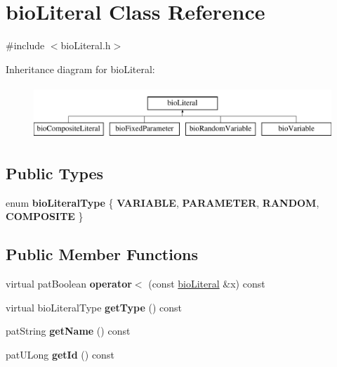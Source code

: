 \hypertarget{classbio_literal}{}\section{bio\+Literal Class Reference}
\label{classbio_literal}


{\ttfamily \#include $<$bio\+Literal.\+h$>$}

Inheritance diagram for bio\+Literal\+:\begin{figure}[H]
\begin{center}
\leavevmode
\includegraphics[height=2.000000cm]{classbio_literal}
\end{center}
\end{figure}
\subsection*{Public Types}
\begin{DoxyCompactItemize}
\item 
\mbox{\label{classbio_literal_aa49fb98b7d7846fdec644ef546b1a302}} 
enum {\bfseries bio\+Literal\+Type} \{ {\bfseries V\+A\+R\+I\+A\+B\+LE}, 
{\bfseries P\+A\+R\+A\+M\+E\+T\+ER}, 
{\bfseries R\+A\+N\+D\+OM}, 
{\bfseries C\+O\+M\+P\+O\+S\+I\+TE}
 \}
\end{DoxyCompactItemize}
\subsection*{Public Member Functions}
\begin{DoxyCompactItemize}
\item 
\mbox{\label{classbio_literal_adb3d80edfd72790e4256a38c39affdfb}} 
virtual pat\+Boolean {\bfseries operator$<$} (const \hyperlink{classbio_literal}{bio\+Literal} \&x) const
\item 
\mbox{\label{classbio_literal_a36c85631858a1efd559550eab3897e35}} 
virtual bio\+Literal\+Type {\bfseries get\+Type} () const
\item 
\mbox{\label{classbio_literal_a4a346ebddd3ccc3490406cc2a9393833}} 
pat\+String {\bfseries get\+Name} () const
\item 
\mbox{\label{classbio_literal_a4fc3184a50035739558543d2ec7803b9}} 
pat\+U\+Long {\bfseries get\+Id} () const
\end{DoxyCompactItemize}
